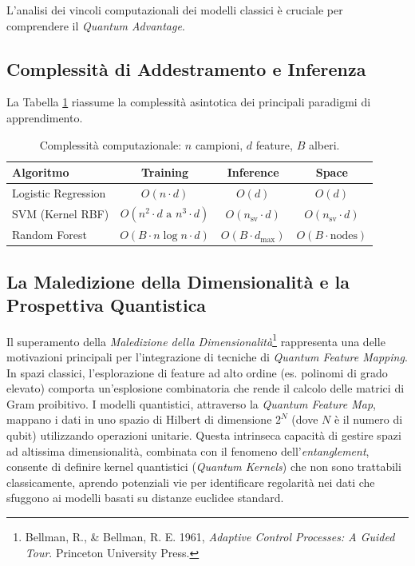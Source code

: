 L'analisi dei vincoli computazionali dei modelli classici è cruciale per comprendere il \textit{Quantum Advantage}.

\subsection{Complessità di Addestramento e Inferenza}
La Tabella \ref{tab:complessita_modelli} riassume la complessità asintotica dei principali paradigmi di apprendimento.

\begin{table}[h]
\centering
\caption{Complessità computazionale: $n$ campioni, $d$ feature, $B$ alberi.}
\label{tab:complessita_modelli}
\begin{tabular}{l|c|c|c}
\hline
\textbf{Algoritmo} & \textbf{Training} & \textbf{Inference} & \textbf{Space} \\
\hline
Logistic Regression & $O(n \cdot d)$ & $O(d)$ & $O(d)$ \\
SVM (Kernel RBF) & $O(n^2 \cdot d \text{ a } n^3 \cdot d)$ & $O(n_{\text{sv}} \cdot d)$ & $O(n_{\text{sv}} \cdot d)$ \\
Random Forest & $O(B \cdot n \log n \cdot d)$ & $O(B \cdot d_{\max})$ & $O(B \cdot \text{nodes})$ \\
\hline
\end{tabular}
\end{table}

\subsection{La Maledizione della Dimensionalità e la Prospettiva Quantistica}
Il superamento della \textit{Maledizione della Dimensionalità}\footnote{Bellman, R., \& Bellman, R. E. 1961, \textit{Adaptive Control Processes: A Guided Tour}. Princeton University Press.} rappresenta una delle motivazioni principali per l'integrazione di tecniche di \textit{Quantum Feature Mapping}.
In spazi classici, l'esplorazione di feature ad alto ordine (es. polinomi di grado elevato) comporta un'esplosione combinatoria che rende il calcolo delle matrici di Gram proibitivo.
I modelli quantistici, attraverso la \textit{Quantum Feature Map}, mappano i dati in uno spazio di Hilbert di dimensione $2^N$ (dove $N$ è il numero di qubit) utilizzando operazioni unitarie. Questa intrinseca capacità di gestire spazi ad altissima dimensionalità, combinata con il fenomeno dell'\textit{entanglement}, consente di definire kernel quantistici (\textit{Quantum Kernels}) che non sono trattabili classicamente, aprendo potenziali vie per identificare regolarità nei dati che sfuggono ai modelli basati su distanze euclidee standard.

